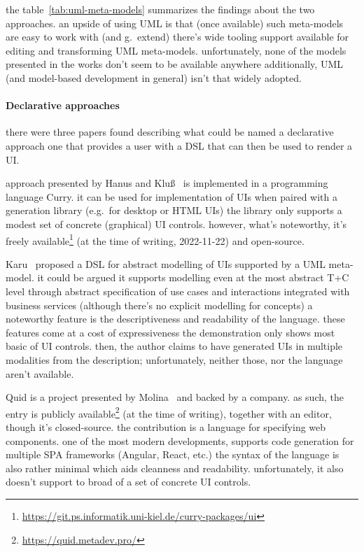 the table~\ref{tab:uml-meta-models} summarizes the findings about the two approaches.
an upside of using UML is that (once available) such meta-models are easy to work with (and\,\textemdash\,g.~extend)\,\textemdash\,there's wide tooling support available for editing and transforming UML meta-models.
unfortunately, none of the models presented in the works don't seem to be available anywhere
additionally, UML (and model-based development in general) isn't that widely adopted.

\paragraph{Declarative approaches}

there were three papers found describing what could be named a declarative approach\,\textemdash\,one that provides a user with a DSL that can then be used to render a UI\@.

approach presented by Hanus and Kluß~\cite{Hanus2008-hm} is implemented in a programming language Curry.
it can be used for implementation of UIs when paired with a generation library (e.g.\ for desktop or HTML UIs)
the library only supports a modest set of concrete (graphical) UI controls.
however, what's noteworthy, it's freely available\footnote{\url{https://git.ps.informatik.uni-kiel.de/curry-packages/ui}} (at the time of writing, 2022-11-22) and open-source.

Karu~\cite{Karu2013-po} proposed a DSL for abstract modelling of UIs supported by a UML meta-model.
it could be argued it supports modelling even at the most abstract T+C level through abstract specification of use cases and interactions integrated with business services (although there's no explicit modelling for concepts)
a noteworthy feature is the descriptiveness and readability of the language.
these features come at a cost of expressiveness\,\textemdash\,the demonstration only shows most basic of UI controls.
then, the author claims to have generated UIs in multiple modalities from the description;
unfortunately, neither those, nor the language aren't available.

Quid is a project presented by Molina~\cite{molina2019quid} and backed by a company.
as such, the entry is publicly available\footnote{\url{https://quid.metadev.pro/}} (at the time of writing), together with an editor, though it's closed-source.
the contribution is a language for specifying web components.
one of the most modern developments, supports code generation for multiple SPA frameworks (Angular, React, etc.)
the syntax of the language is also rather minimal which aids cleanness and readability.
unfortunately, it also doesn't support to broad of a set of concrete UI controls.

